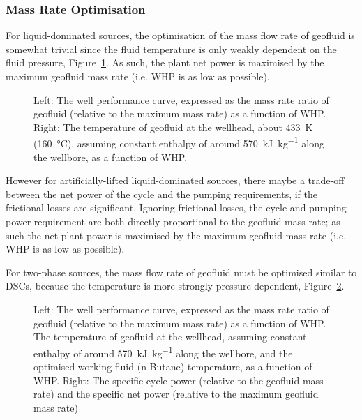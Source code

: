         \subsubsection{Mass Rate Optimisation}
            For liquid-dominated sources, the optimisation of the mass flow rate of geofluid is somewhat trivial since the fluid temperature is only weakly dependent on the fluid pressure, Figure~\ref{fig:litrev_ORC_Liq_Mrat_opts}. As such, the plant net power is maximised by the maximum geofluid mass rate (i.e. \ac{WHP} is as low as possible).

             \begin{figure}[H]
                \centering
                
                \caption[Optimisation of the geofluid working fluid mass rate ratio for a liquid dominated heat source.]{Left: The well performance curve, expressed as the mass rate ratio of geofluid (relative to the maximum mass rate) as a function of \ac{WHP}. Right: The temperature of geofluid at the wellhead, about \qty{433}{\K} (\qty{160}{\degreeCelsius}), assuming constant enthalpy of around \qty{570}{\kilo\joule\per\kg} along the wellbore, as a function of \ac{WHP}.}
                \label{fig:litrev_ORC_Liq_Mrat_opts}
            \end{figure}

            However for artificially-lifted liquid-dominated sources, there maybe a trade-off between the net power of the cycle and the pumping requirements, if the frictional losses are significant. Ignoring frictional losses, the cycle and pumping power requirement are both directly proportional to the geofluid mass rate; as such the net plant power is maximised by the maximum geofluid mass rate (i.e. \ac{WHP} is as low as possible).

            For two-phase sources, the mass flow rate of geofluid must be optimised similar to \ac{DSC}s, because the temperature is more strongly pressure dependent, Figure~\ref{fig:litrev_ORC_Vap_Mrat_opts}.

             \begin{figure}[H]
                \centering
                
                \caption[Optimisation of the geofluid working fluid mass rate ratio for a two-phase heat source.]{Left: The well performance curve, expressed as the mass rate ratio of geofluid (relative to the maximum mass rate) as a function of \ac{WHP}. The temperature of geofluid at the wellhead, assuming constant enthalpy of around \qty{570}{\kilo\joule\per\kg} along the wellbore, and the optimised working fluid (n-Butane) temperature, as a function of \ac{WHP}. Right: The specific cycle power (relative to the geofluid mass rate) and the specific net power (relative to the maximum geofluid mass rate)}
                \label{fig:litrev_ORC_Vap_Mrat_opts}
            \end{figure}


